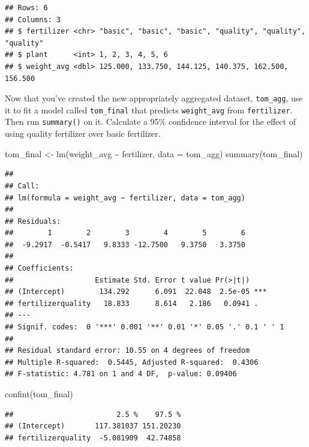 \documentclass[
  openany]{book}
\newenvironment{Shaded}{\begin{snugshade}}{\end{snugshade}}
\newcommand{\AttributeTok}[1]{\textcolor[rgb]{0.77,0.63,0.00}{#1}}
\newcommand{\FunctionTok}[1]{\textcolor[rgb]{0.00,0.00,0.00}{#1}}
\newcommand{\NormalTok}[1]{#1}
\newcommand{\OtherTok}[1]{\textcolor[rgb]{0.56,0.35,0.01}{#1}}
\newcommand{\SpecialCharTok}[1]{\textcolor[rgb]{0.00,0.00,0.00}{#1}}
\begin{document}
\begin{verbatim}
## Rows: 6
## Columns: 3
## $ fertilizer <chr> "basic", "basic", "basic", "quality", "quality", "quality"
## $ plant      <int> 1, 2, 3, 4, 5, 6
## $ weight_avg <dbl> 125.000, 133.750, 144.125, 140.375, 162.500, 156.500
\end{verbatim}

Now that you've created the new appropriately aggregated dataset, \texttt{tom\_agg}, use it to fit a model called \texttt{tom\_final} that predicts \texttt{weight\_avg} from \texttt{fertilizer}. Then run \texttt{summary()} on it. Calculate a 95\% confidence interval for the effect of using quality fertilizer over basic fertilizer.

\begin{Shaded}
\begin{Highlighting}[]
\NormalTok{tom\_final }\OtherTok{\textless{}{-}} \FunctionTok{lm}\NormalTok{(weight\_avg }\SpecialCharTok{\textasciitilde{}}\NormalTok{ fertilizer, }\AttributeTok{data =}\NormalTok{ tom\_agg)}
\FunctionTok{summary}\NormalTok{(tom\_final)}
\end{Highlighting}
\end{Shaded}

\begin{verbatim}
## 
## Call:
## lm(formula = weight_avg ~ fertilizer, data = tom_agg)
## 
## Residuals:
##        1        2        3        4        5        6 
##  -9.2917  -0.5417   9.8333 -12.7500   9.3750   3.3750 
## 
## Coefficients:
##                   Estimate Std. Error t value Pr(>|t|)    
## (Intercept)        134.292      6.091  22.048  2.5e-05 ***
## fertilizerquality   18.833      8.614   2.186   0.0941 .  
## ---
## Signif. codes:  0 '***' 0.001 '**' 0.01 '*' 0.05 '.' 0.1 ' ' 1
## 
## Residual standard error: 10.55 on 4 degrees of freedom
## Multiple R-squared:  0.5445, Adjusted R-squared:  0.4306 
## F-statistic: 4.781 on 1 and 4 DF,  p-value: 0.09406
\end{verbatim}

\begin{Shaded}
\begin{Highlighting}[]
\FunctionTok{confint}\NormalTok{(tom\_final)}
\end{Highlighting}
\end{Shaded}

\begin{verbatim}
##                        2.5 %    97.5 %
## (Intercept)       117.381037 151.20230
## fertilizerquality  -5.081909  42.74858
\end{verbatim}
\end{document}
